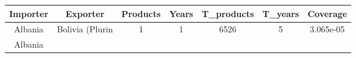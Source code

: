 \documentclass[10pt,]{article}
\begin{document}
\begin{longtable}[]{@{}ccccccc@{}}
\toprule
\begin{minipage}[b]{0.11\columnwidth}\centering\strut
Importer\strut
\end{minipage} & \begin{minipage}[b]{0.16\columnwidth}\centering\strut
Exporter\strut
\end{minipage} & \begin{minipage}[b]{0.11\columnwidth}\centering\strut
Products\strut
\end{minipage} & \begin{minipage}[b]{0.08\columnwidth}\centering\strut
Years\strut
\end{minipage} & \begin{minipage}[b]{0.13\columnwidth}\centering\strut
T\_products\strut
\end{minipage} & \begin{minipage}[b]{0.10\columnwidth}\centering\strut
T\_years\strut
\end{minipage} & \begin{minipage}[b]{0.10\columnwidth}\centering\strut
Coverage\strut
\end{minipage}\tabularnewline
\midrule
\endhead
\begin{minipage}[t]{0.11\columnwidth}\centering\strut
Albania\strut
\end{minipage} & \begin{minipage}[t]{0.16\columnwidth}\centering\strut
Bolivia (Plurin\strut
\end{minipage} & \begin{minipage}[t]{0.11\columnwidth}\centering\strut
1\strut
\end{minipage} & \begin{minipage}[t]{0.08\columnwidth}\centering\strut
1\strut
\end{minipage} & \begin{minipage}[t]{0.13\columnwidth}\centering\strut
6526\strut
\end{minipage} & \begin{minipage}[t]{0.10\columnwidth}\centering\strut
5\strut
\end{minipage} & \begin{minipage}[t]{0.10\columnwidth}\centering\strut
3.065e-05\strut
\end{minipage}\tabularnewline
\begin{minipage}[t]{0.11\columnwidth}\centering\strut
Albania\strut
\end{minipage} & \begin{minipage}[t]{0.16\columnwidth}\centering\strut

\end{minipage}
\end{longtable}
\end{document}
